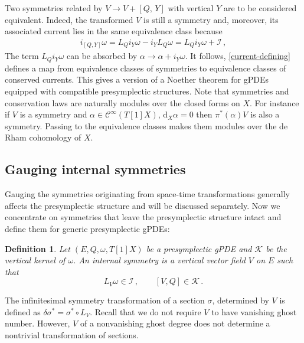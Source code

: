 \documentclass[a4paper,12pt]{article}
\numberwithin{equation}{section} %
\newtheorem{definition}[thm]{Definition}
\newcommand{\dx}{\mathrm{d}_X}
\newcommand{\commut}[2]{[#1{,}\,#2]}
\newcommand{\cC}{\mathcal{C}}
\def\cI{\mathcal{I}}
\def\cK{\mathcal{K}}
\begin{document}
Two symmetries related by $V \to V+\commut{Q}{Y}$ with vertical $Y$ are to be considered equivalent. Indeed, the transformed $V$ is still a symmetry and, moreover, its associated current lies in the same equivalence class because
\begin{equation}
\begin{gathered}
    i_{[Q,Y]}\omega = L_Q i_Y \omega - i_YL_Q\omega = L_Q i_Y \omega + \cI\,,
\end{gathered}
\end{equation}
The term $L_Qi_Y\omega$ can be absorbed by $\alpha \to \alpha + i_Y\omega$. 
It follows, \eqref{current-defining} defines a map from equivalence classes of symmetries to equivalence classes of conserved currents. This gives a version of a Noether theorem for gPDEs equipped with compatible presymplectic structures. Note that symmetries and conservation laws are naturally modules over the closed forms on $X$. For instance if $V$ is a symmetry and $\alpha\in \cC^{\infty}(T[1]X)$, $\dx\alpha=0$ then $\pi^*(\alpha)V$ is also a symmetry. Passing to the equivalence classes makes them modules over the de Rham cohomology of $X$.  


\subsection{Gauging internal symmetries}\label{sec:internal-symmetries}
Gauging the symmetries originating from space-time transformations generally affects the presymplectic structure and will be discussed separately. Now we concentrate on symmetries that leave the presymplectic structure intact and define them for generic presymplectic gPDEs:
\begin{definition}\label{def:internal-sym}
    Let $(E,Q,\omega,T[1]X)$ be a presymplectic gPDE and $\cK$ be the vertical kernel of $\omega$.  An internal symmetry is a vertical vector field $V$ on $E$ such that
    \begin{equation} \label{comp_symmetry}
        L_V\omega \in  \cI \,, \qquad 
            [V,Q] \in \cK\,.
    \end{equation}
\end{definition}
The infinitesimal symmetry transformation of a section $\sigma$, determined by $V$ is defined as $\delta \sigma^* = \sigma^* \circ L_{V}$. Recall that we do not require $V$ to have vanishing ghost number. However, $V$ of a nonvanishing ghost degree does not determine a nontrivial transformation of sections.  
\end{document}
